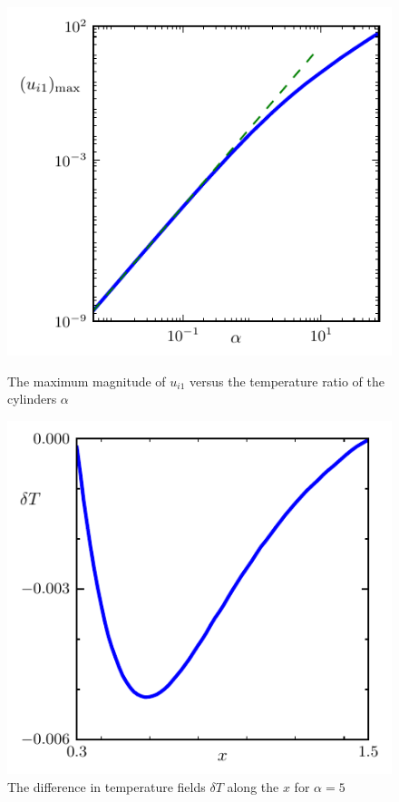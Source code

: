 \documentclass[smallextended, referee]{svjour3} %
\begin{document}
\begin{figure}[ht]
	\centering
	\begin{minipage}{.48\textwidth}
		\centering
		\includegraphics{Fig10}
		\caption{The maximum magnitude of \(u_{i1}\) versus the temperature ratio of the cylinders \(\alpha\)}
		\label{fig:maxU}
	\end{minipage}
	\quad
	\begin{minipage}{.48\textwidth}
		\centering
		\includegraphics{Fig11}
		\caption{The difference in temperature fields \(\delta T\) along the \(x\) for \(\alpha = 5\)}
		\label{fig:deltaT}
	\end{minipage}
\end{figure}
\end{document}
